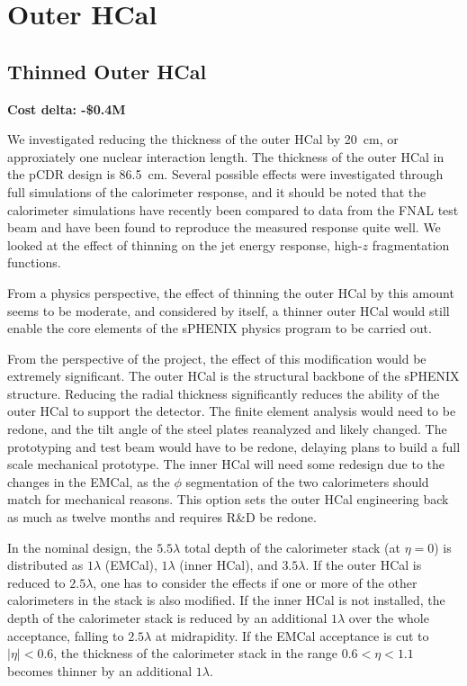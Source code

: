 \section{Outer HCal}
\subsection{Thinned Outer HCal}
\label{ohcal_thin}

\textbf{Cost delta: -\$0.4M}

We investigated reducing the thickness of the outer HCal by 20~cm, or
approxiately one nuclear interaction length.  The thickness of the
outer HCal in the pCDR design is 86.5~cm.  Several possible effects
were investigated through full \geant simulations of the calorimeter
response, and it should be noted that the calorimeter simulations have
recently been compared to data from the FNAL test beam and have been
found to reproduce the measured response quite well.  We looked at the
effect of thinning on the jet energy response, high-$z$ fragmentation
functions.

From a physics perspective, the effect of thinning the outer HCal by
this amount seems to be moderate, and considered by itself, a thinner
outer HCal would still enable the core elements of the sPHENIX physics
program to be carried out.

From the perspective of the project, the effect of this modification
would be extremely significant.  The outer HCal is the structural
backbone of the sPHENIX structure.  Reducing the radial thickness
significantly reduces the ability of the outer HCal to support the
detector.  The finite element analysis would need to be redone, and
the tilt angle of the steel plates reanalyzed and likely changed. The
prototyping and test beam would have to be redone, delaying plans to
build a full scale mechanical prototype.  The inner HCal will need
some redesign due to the changes in the EMCal, as the $\phi$
segmentation of the two calorimeters should match for mechanical
reasons.  This option sets the outer HCal engineering back as much as
twelve months and requires R\&D be redone.

In the nominal design, the $5.5 \lambda$ total depth of the
calorimeter stack (at $\eta = 0$) is distributed as $1 \lambda$
(EMCal), $1 \lambda$ (inner HCal), and $3.5 \lambda$.  If the outer
HCal is reduced to $2.5 \lambda$, one has to consider the effects if
one or more of the other calorimeters in the stack is also modified.
If the inner HCal is not installed, the depth of the calorimeter stack
is reduced by an additional $1 \lambda$ over the whole acceptance,
falling to $2.5 \lambda$ at midrapidity.  If the EMCal acceptance is
cut to $|\eta| < 0.6$, the thickness of the calorimeter stack in the
range $0.6 < \eta < 1.1$ becomes thinner by an additional $1 \lambda$.


